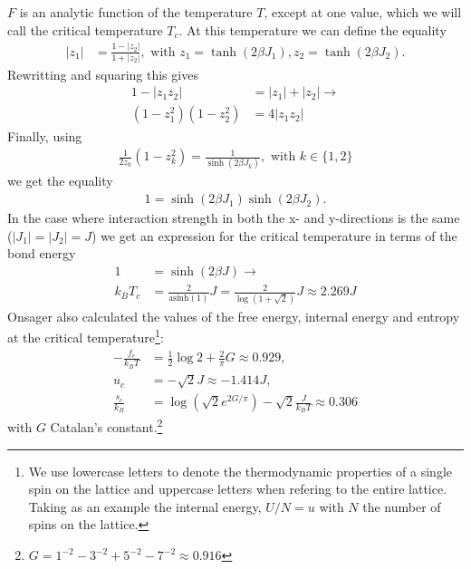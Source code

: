 \documentclass[11pt, a4paper]{report} %
\begin{document}
\(F\) is an analytic function of the temperature \(T\), except at one value, which we will call the critical temperature \(T_c\). At this temperature we can define the equality
\begin{align}
	\left|z_1\right| &= \frac{1 - \left| z_2 \right|}{1+\left| z_2 \right|}, \text{ with } z_1 = \tanh(2\beta J_1), z_2 = \tanh(2\beta J_2).
\end{align}
Rewritting and squaring this gives
\begin{align}
	1 - \left|z_1 z_2\right| &= \left|z_1\right| + \left|z_2\right|\rightarrow\\
	\left(1 - z_1^2 \right) \left(1 - z_2^2 \right) &= 4 \left| z_1 z_2 \right|
\end{align}
Finally, using
\begin{align}
	\frac{1}{2 z_k}\left(1 - z_k^2\right) = \frac{1}{\sinh(2 \beta J_k)}, \text{ with } k \in \{{1, 2}\}
\end{align}
we get the equality
\begin{align}
	1 = \sinh(2\beta J_1) \sinh(2\beta J_2).
\end{align}
In the case where interaction strength in both the x- and y-directions is the same (\(\left|J_1\right| = \left|J_2\right| = J\)) we get an expression for the critical temperature in terms of the bond energy
\begin{align}
	1 &= \sinh(2\beta J) \to \\
	k_B T_c &= \frac{2}{\text{asinh}(1)}J = \frac{2}{\log(1+\sqrt{2})}J \approx 2.269 J
\end{align}
Onsager \cite{onsager:1944} also calculated the values of the free energy, internal energy and entropy at the critical temperature\footnote{We use lowercase letters to denote the thermodynamic properties of a single spin on the lattice and uppercase letters when refering to the entire lattice. Taking as an example the internal energy, \(U/N = u\) with \(N\) the number of spins on the lattice.}:
\begin{align}
	-\frac{f_c}{k_B T} &= \frac{1}{2} \log{2} + \frac{2}{\pi} G \approx 0.929, \\
	u_c &= - \sqrt{2} J \approx - 1.414 J,\\
	\frac{s_c}{k_B} &= \log{(\sqrt{2} e^{2G/\pi})} - \sqrt{2} \frac{J}{k_B T} \approx 0.306
\end{align}
with \(G\) Catalan's constant.\footnote{\(G = 1^{-2} - 3^{-2} + 5^{-2} - 7^{-2} \approx 0.916\)}
\end{document}
